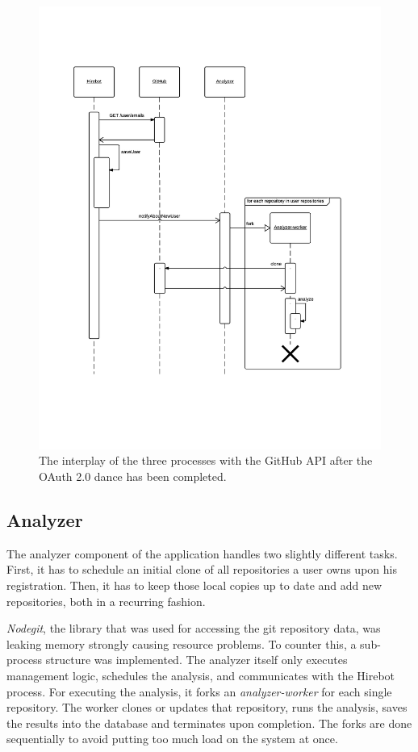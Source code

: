 \begin{figure}
  \centering
  \includegraphics[width=35em]{gfx/registersequence.png}
  \caption{The interplay of the three processes with the GitHub API after the OAuth 2.0 dance has been completed.}
  \label{fig:regprocess}
\end{figure}

\subsection{Analyzer}
The analyzer component of the application handles two slightly different tasks. First, it has to schedule an initial clone of all repositories a user owns upon his registration. Then, it has to keep those local copies up to date and add new repositories, both in a recurring fashion.


\textit{Nodegit}, the library that was used for accessing the git repository data, was leaking memory strongly causing resource problems. To counter this, a sub-process structure was implemented. The analyzer itself only executes management logic, schedules the analysis, and communicates with the Hirebot process. For executing the analysis, it forks an \textit{analyzer-worker} for each single repository. The worker clones or updates that repository, runs the analysis, saves the results into the database and terminates upon completion. The forks are done sequentially to avoid putting too much load on the system at once.

